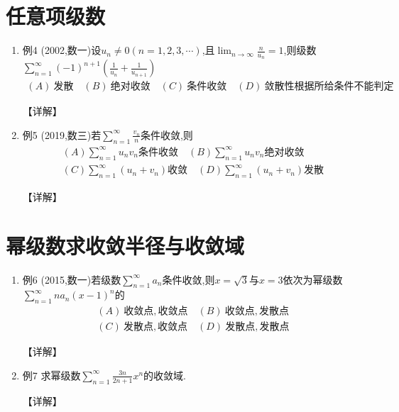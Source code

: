 \documentclass[12pt, a4paper, oneside, UTF8]{ctexbook}
\begin{document}
\section{任意项级数}

\begin{enumerate}[label=\arabic*.,start=4]
    \item 例4 (2002,数一)设$u_n\neq 0(n=1,2,3,\cdots)$,且$\lim_{n\rightarrow\infty}\frac{n}{u_n}=1$,则级数$\sum_{n=1}^{\infty}(-1)^{n+1}\left(\frac{1}{u_n}+\frac{1}{u_{n+1}}\right)$
    \begin{align*}
        (A)\ 发散 \quad (B)\ 绝对收敛 \quad (C)\ 条件收敛 \quad (D)\ 敛散性根据所给条件不能判定
    \end{align*}
    
    \begin{solution}
    【详解】
    \end{solution}
    
    \item 例5 (2019,数三)若$\sum_{n=1}^{\infty}\frac{v_n}{n}$条件收敛,则
    \begin{align*}
        (A)\sum_{n=1}^{\infty} u_n v_n\text{条件收敛} \quad (B)\sum_{n=1}^{\infty} u_n v_n\text{绝对收敛} \\
        (C)\sum_{n=1}^{\infty}\left(u_n+v_n\right)\text{收敛} \quad (D)\sum_{n=1}^{\infty}\left(u_n+v_n\right)\text{发散}
    \end{align*}
    
    \begin{solution}
    【详解】
    \end{solution}
\end{enumerate}

\section{幂级数求收敛半径与收敛域}

\begin{enumerate}[label=\arabic*.,start=6]
    \item 例6 (2015,数一)若级数$\sum_{n=1}^{\infty} a_n$条件收敛,则$x=\sqrt{3}$与$x=3$依次为幂级数$\sum_{n=1}^{\infty} n a_n(x-1)^n$的
    \begin{align*}
        (A)\ 收敛点,收敛点 \quad (B)\ 收敛点,发散点 \\
        (C)\ 发散点,收敛点 \quad (D)\ 发散点,发散点
    \end{align*}
    
    \begin{solution}
    【详解】
    \end{solution}
    
    \item 例7 求幂级数$\sum_{n=1}^{\infty}\frac{3n}{2n+1}x^n$的收敛域.
    
    \begin{solution}
    【详解】
    \end{solution}
\end{enumerate}
\end{document}
